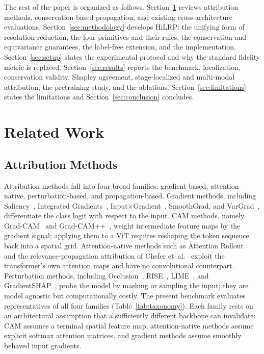 \documentclass[lettersize,journal]{IEEEtran}
\theoremstyle{definition}
\theoremstyle{plain}
\begin{document}
The rest of the paper is organized as follows. Section~\ref{sec:related} reviews attribution methods, conservation-based propagation, and existing cross-architecture evaluations. Section~\ref{sec:methodology} develops HiLRP: the unifying form of resolution reduction, the four primitives and their rules, the conservation and equivariance guarantees, the label-free extension, and the implementation. Section~\ref{sec:setup} states the experimental protocol and why the standard fidelity metric is replaced. Section~\ref{sec:results} reports the benchmark, localization, conservation validity, Shapley agreement, stage-localized and multi-modal attribution, the pretraining study, and the ablations. Section~\ref{sec:limitations} states the limitations and Section~\ref{sec:conclusion} concludes.

\section{Related Work}
\label{sec:related}

\subsection{Attribution Methods}
Attribution methods fall into four broad families: gradient-based, attention-native, perturbation-based, 
and propagation-based. Gradient methods, including
Saliency~\cite{simonyan2014saliency}, Integrated
Gradients~\cite{sundararajan2017ig}, Input$\times$Gradient~\cite{shrikumar2017deeplift}, 
SmoothGrad, and VarGrad~\cite{smilkov2017smoothgrad}, differentiate the class logit with 
respect to the input. CAM methods, namely Grad-CAM~\cite{selvaraju2017gradcam} and
Grad-CAM++~\cite{chattopadhay2018gradcampp}, weight intermediate feature maps by the gradient signal; 
applying them to a ViT requires reshaping the token sequence back into a spatial grid. Attention-native methods 
such as Attention Rollout~\cite{abnar2020rollout} and the relevance-propagation attribution of Chefer et~al.~\cite{chefer2021transformer, bach2015lrp} 
exploit the transformer's own attention maps and have no convolutional counterpart. Perturbation methods, 
including Occlusion~\cite{zeiler2014occlusion}, RISE~\cite{petsiuk2018rise}, LIME~\cite{ribeiro2016lime}, and GradientSHAP~\cite{lundberg2017shap}, 
probe the model by masking or sampling the input; they are model agnostic but computationally costly. The present benchmark evaluates representatives 
of all four families (Table~\ref{tab:taxonomy}). Each family rests on an architectural assumption that a sufficiently different backbone can invalidate: 
CAM assumes a terminal spatial feature map, attention-native methods assume explicit softmax attention matrices, and gradient methods assume smoothly 
behaved input gradients.
\end{document}
